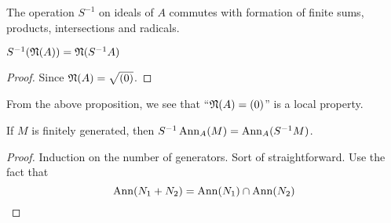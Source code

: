 \begin{proposition}
    The operation $S^{-1}$ on ideals of $A$ commutes with formation of finite sums, products, intersections and radicals.
\end{proposition}

\begin{corollary}
    $S^{-1}(\mathfrak N(A)) = \mathfrak N(S^{-1}A)$
\end{corollary}
\begin{proof}
    Since $\mathfrak N(A) = \sqrt{(0)}$.
\end{proof}

From the above proposition, we see that ``$\mathfrak N(A) = (0)$'' is a local property.

\begin{proposition}
    If $M$ is finitely generated, then $S^{-1}\operatorname{Ann}_A(M) = \operatorname{Ann}_A(S^{-1}M)$. 
\end{proposition}
\begin{proof}
    Induction on the number of generators. Sort of straightforward. Use the fact that 
    \begin{equation*}
        \operatorname{Ann}(N_1 + N_2) = \operatorname{Ann}(N_1)\cap\operatorname{Ann}(N_2)
    \end{equation*}
\end{proof}